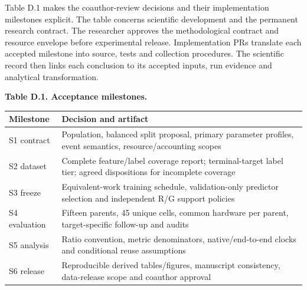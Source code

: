\documentclass[
  british,
  10pt,
]{article}
\newcounter{none} %
\begin{document}
Table D.1 makes the coauthor-review decisions and their implementation
milestones explicit. The table concerns scientific development and the
permanent research contract. The researcher approves the methodological
contract and resource envelope before experimental release.
Implementation PRs translate each accepted milestone into source, tests
and collection procedures. The scientific record then links each
conclusion to its accepted inputs, run evidence and analytical
transformation.


\textbf{Table D.1. Acceptance milestones.}

{\def\LTcaptype{none} %
\begin{longtable}[]{@{}
  >{\raggedright\arraybackslash}p{}
  >{\raggedright\arraybackslash}p{}@{}}
\toprule\noalign{}
\begin{minipage}[b]{\linewidth}\raggedright
Milestone
\end{minipage} & \begin{minipage}[b]{\linewidth}\raggedright
Decision and artifact
\end{minipage} \\
\midrule\noalign{}
\endhead
\bottomrule\noalign{}
\endlastfoot
S1 contract & Population, balanced split proposal, primary parameter
profiles, event semantics, resource/accounting scopes \\
S2 dataset & Complete feature/label coverage report; terminal-target
label tier; agreed dispositions for incomplete coverage \\
S3 freeze & Equivalent-work training schedule, validation-only predictor
selection and independent R/G support policies \\
S4 evaluation & Fifteen parents, 45 unique cells, common hardware per
parent, target-specific follow-up and audits \\
S5 analysis & Ratio convention, metric denominators, native/end-to-end
clocks and conditional reuse assumptions \\
S6 release & Reproducible derived tables/figures, manuscript
consistency, data-release scope and coauthor approval \\
\end{longtable}
}
\end{document}

